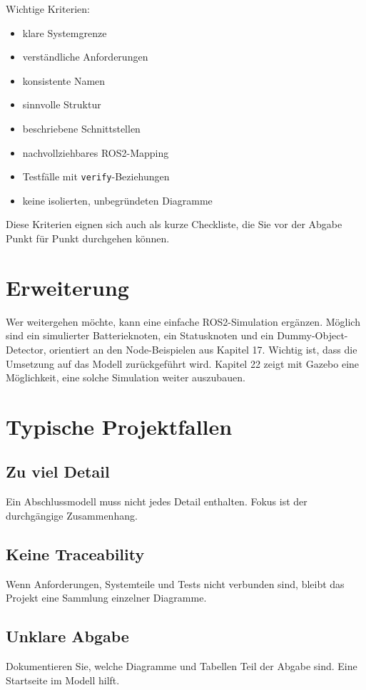 Wichtige Kriterien:

\begin{itemize}
    \item klare Systemgrenze
    \item verständliche Anforderungen
    \item konsistente Namen
    \item sinnvolle Struktur
    \item beschriebene Schnittstellen
    \item nachvollziehbares ROS2-Mapping
    \item Testfälle mit \texttt{verify}-Beziehungen
    \item keine isolierten, unbegründeten Diagramme
\end{itemize}

Diese Kriterien eignen sich auch als kurze Checkliste, die Sie vor der Abgabe Punkt für Punkt durchgehen können.

\section{Erweiterung}
Wer weitergehen möchte, kann eine einfache ROS2-Simulation ergänzen. Möglich sind ein simulierter Batterieknoten, ein Statusknoten und ein Dummy-Object-Detector, orientiert an den Node-Beispielen aus Kapitel 17. Wichtig ist, dass die Umsetzung auf das Modell zurückgeführt wird. Kapitel 22 zeigt mit Gazebo eine Möglichkeit, eine solche Simulation weiter auszubauen.

\section{Typische Projektfallen}
\subsection{Zu viel Detail}
Ein Abschlussmodell muss nicht jedes Detail enthalten. Fokus ist der durchgängige Zusammenhang.

\subsection{Keine Traceability}
Wenn Anforderungen, Systemteile und Tests nicht verbunden sind, bleibt das Projekt eine Sammlung einzelner Diagramme.

\subsection{Unklare Abgabe}
Dokumentieren Sie, welche Diagramme und Tabellen Teil der Abgabe sind. Eine Startseite im Modell hilft.

